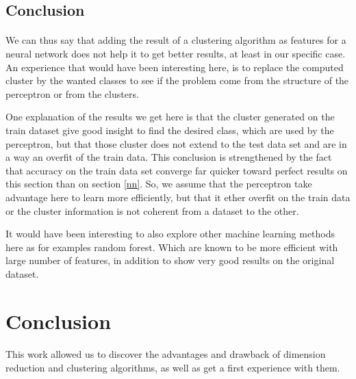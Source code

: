 \documentclass[twocolumn,a4paper,10pt]{article}
\begin{document}
\subsection{Conclusion}


\paragraph{}

We can thus say that adding the result of a clustering algorithm as
features for a neural network does not help it to get better results,
at least in our specific case. An experience that would have been
interesting here, is to replace the computed cluster by the wanted
classes to see if the problem come from the structure of the perceptron
or from the clusters.

One explanation of the results we get here is that the cluster generated
on the train dataset give good insight to find the desired class,
which are used by the perceptron, but that those cluster does not
extend to the test data set and are in a way an overfit of the train
data. This conclusion is strengthened by the fact that accuracy on
the train data set converge far quicker toward perfect results on
this section than on section \ref{nn}. So, we assume that the perceptron
take advantage here to learn more efficiently, but that it ether overfit
on the train data or the cluster information is not coherent from
a dataset to the other.

It would have been interesting to also explore other machine learning
methods here as for examples random forest. Which are known to be
more efficient with large number of features, in addition to show
very good results on the original dataset.


\section{Conclusion}

\paragraph{}

This work allowed us to discover the advantages and drawback of dimension
reduction and clustering algorithms, as well as get a first experience
with them.
\end{document}
